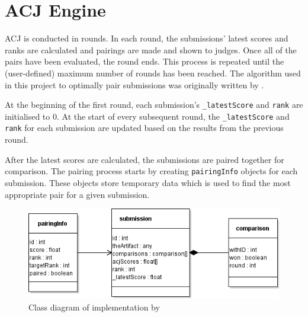 \documentclass{l4proj}
\begin{document}
\section{ACJ Engine}

ACJ is conducted in rounds. In each round, the submissions' latest scores and ranks are calculated and pairings are made and shown to judges. Once all of the pairs have been evaluated, the round ends. This process is repeated until the (user-defined) maximum number of rounds has been reached. The algorithm used in this project to optimally pair submissions was originally written by \citet{nbarr:pseudocode} .

At the beginning of the first round, each submission's \lstinline{_latestScore} and \lstinline{rank} are initialised to 0. At the start of every subsequent round, the \lstinline{_latestScore} and \lstinline{rank} for each submission are updated based on the results from the previous round. 

After the latest scores are calculated, the submissions are paired together for comparison. The pairing process starts by creating \lstinline{pairingInfo} objects for each submission. These objects store temporary data which is used to find the most appropriate pair for a given submission.

\begin{figure}[h]
\begin{center}
\includegraphics{images/acj1.class.png}
\caption{Class diagram of implementation by \cite{nbarr:pseudocode}}
\end{center}
\end{figure}
\end{document}
